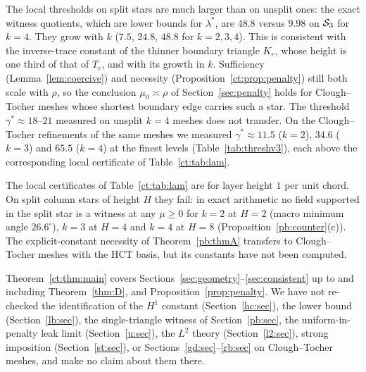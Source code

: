 \begin{remark}
The local thresholds on split stars are much larger than on unsplit ones: the exact witness quotients, which are lower bounds for $\lambda^\ast$, are $48.8$ versus $9.98$ on $\mathcal S_3$ for $k=4$. They grow with $k$ ($7.5$, $24.8$, $48.8$ for $k=2,3,4$). This is consistent with the inverse-trace constant of the thinner boundary triangle $K_e$, whose height is one third of that of $T_e$, and with its growth in $k$. Sufficiency (Lemma~\ref{lem:coercive}) and necessity (Proposition~\ref{ct:prop:penalty}) still both scale with $\rho$, so the conclusion $\mu_0\asymp\rho$ of Section~\ref{sec:penalty} holds for Clough--Tocher meshes whose shortest boundary edge carries such a star. The threshold $\gamma^\ast\approx18$--$21$ measured on unsplit $k=4$ meshes does not transfer. On the Clough--Tocher refinements of the same meshes we measured $\gamma^\ast\approx11.5$ ($k=2$), $34.6$ ($k=3$) and $65.5$ ($k=4$) at the finest levels (Table~\ref{tab:threshv3}), each above the corresponding local certificate of Table~\ref{ct:tab:lam}.
\end{remark}

\begin{remark}
The local certificates of Table~\ref{ct:tab:lam} are for layer height $1$ per unit chord. On split column stars of height $H$ they fail: in exact arithmetic no field supported in the split star is a witness at any $\mu\ge0$ for $k=2$ at $H=2$ (macro minimum angle $26.6^\circ$), $k=3$ at $H=4$ and $k=4$ at $H=8$ (Proposition~\ref{pb:counter}(c)). The explicit-constant necessity of Theorem~\ref{pb:thmA} transfers to Clough--Tocher meshes with the HCT basis, but its constants have not been computed.
\end{remark}

\begin{remark}[Scope]\label{ct:rem:scope}
Theorem~\ref{ct:thm:main} covers Sections~\ref{sec:geometry}--\ref{sec:consistent} up to and including Theorem~\ref{thm:D}, and Proposition~\ref{prop:penalty}. We have not re-checked the identification of the $H^1$ constant (Section~\ref{hc:sec}), the lower bound (Section~\ref{lb:sec}), the single-triangle witness of Section~\ref{pb:sec}, the uniform-in-penalty leak limit (Section~\ref{u:sec}), the $L^2$ theory (Section~\ref{l2:sec}), strong imposition (Section~\ref{st:sec}), or Sections~\ref{gd:sec}--\ref{rb:sec} on Clough--Tocher meshes, and make no claim about them there.
\end{remark}
